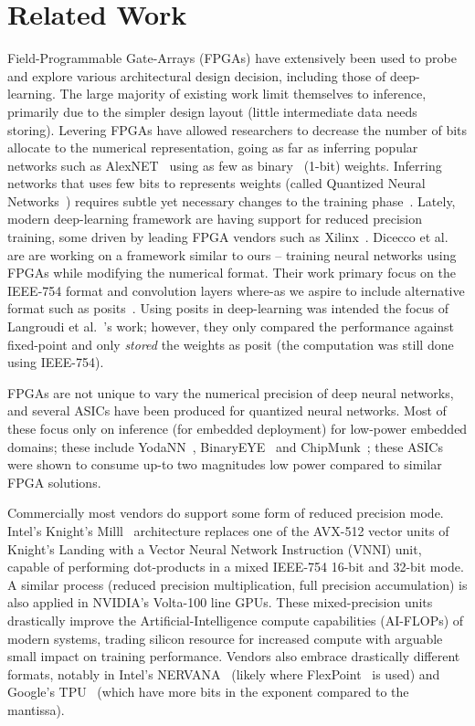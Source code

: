 \documentclass[techrep,english]{ipsj}
\begin{document}
\section{Related Work}\label{sec:relwork}
Field-Programmable Gate-Arrays (FPGAs) have extensively been used to probe and explore various architectural design decision, including those of deep-learning. The large majority of existing work limit themselves to inference, primarily due to the simpler design layout (little intermediate data needs storing). Levering FPGAs have allowed researchers to decrease the number of bits allocate to the numerical representation, going as far as inferring popular networks such as  AlexNET~\cite{krizhevsky2012imagenet} using as few as binary~\cite{shimoda2017all,umuroglu2017finn} (1-bit) weights. Inferring networks that uses few bits to represents weights (called Quantized Neural Networks~\cite{courbariaux2016binarized}) requires subtle yet necessary changes to the training phase~\cite{binaryconnect,courbariaux2016binarized,zhou2016dorefa}. Lately, modern deep-learning framework are having support for reduced precision training, some driven by leading FPGA vendors such as Xilinx~\cite{xilinxml}.
Dicecco et al.~\cite{dicecco2017fpga} are are working on a framework similar to ours – training neural networks using FPGAs while modifying the numerical format. Their work primary focus on the IEEE-754 format and convolution layers where-as we aspire to include alternative format such as posits~\cite{posits}. Using posits in deep-learning was intended the focus of Langroudi et al.~\cite{langroudi2018deep}’s work; however, they only compared the performance against fixed-point and only \textit{stored} the weights as posit (the computation was still done using IEEE-754).

FPGAs are not unique to vary the numerical precision of deep neural networks, and several ASICs have been produced for quantized neural networks. Most of these focus only on inference (for embedded deployment)  for low-power embedded domains; these include YodaNN~\cite{yodann}, BinaryEYE~\cite{binaryeye} and ChipMunk~\cite{chipmunk}; these ASICs were shown to consume up-to two magnitudes low power compared to similar FPGA solutions.

Commercially most vendors do support some form of reduced precision mode. Intel’s Knight’s Milll~\cite{knm} architecture replaces one of the AVX-512 vector units of Knight’s Landing with a Vector Neural Network Instruction (VNNI) unit, capable of performing dot-products in a mixed IEEE-754 16-bit and 32-bit mode. A similar process (reduced precision multiplication, full precision accumulation) is also applied in NVIDIA’s Volta-100 line GPUs. These mixed-precision units drastically improve the Artificial-Intelligence compute capabilities (AI-FLOPs) of modern systems, trading silicon resource for increased compute with arguable small impact on training performance. Vendors also embrace drastically different formats, notably in Intel’s NERVANA~\cite{nervana} (likely where FlexPoint~\cite{intelflexpoint} is used) and Google’s TPU~\cite{tpuformat} (which have more bits in the exponent compared to the mantissa).
\end{document}
